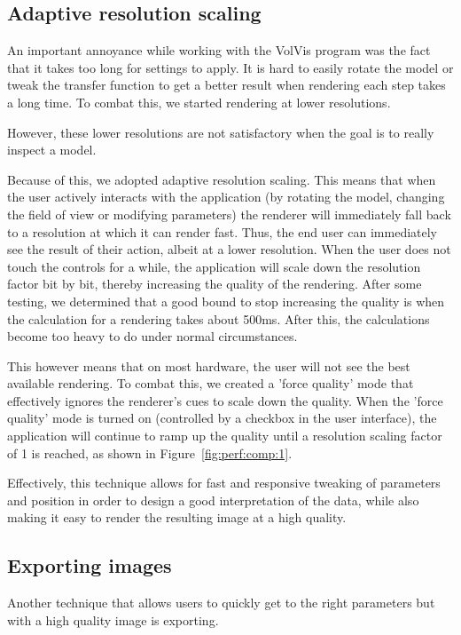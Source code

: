 \subsection{Adaptive resolution scaling}
An important annoyance while working with the VolVis program was the fact that it takes too long for settings to apply.
It is hard to easily rotate the model or tweak the transfer function to get a better result when rendering each step takes a long time.
To combat this, we started rendering at lower resolutions.

However, these lower resolutions are not satisfactory when the goal is to really inspect a model.

Because of this, we adopted adaptive resolution scaling.
This means that when the user actively interacts with the application (by rotating the model, changing the field of view or modifying parameters) the renderer will immediately fall back to a resolution at which it can render fast.
Thus, the end user can immediately see the result of their action, albeit at a lower resolution.
When the user does not touch the controls for a while, the application will scale down the resolution factor bit by bit, thereby increasing the quality of the rendering.
After some testing, we determined that a good bound to stop increasing the quality is when the calculation for a rendering takes about 500ms.
After this, the calculations become too heavy to do under normal circumstances.

This however means that on most hardware, the user will not see the best available rendering.
To combat this, we created a 'force quality' mode that effectively ignores the renderer's cues to scale down the quality.
When the 'force quality' mode is turned on (controlled by a checkbox in the user interface), the application will continue to ramp up the quality until a resolution scaling factor of 1 is reached, as shown in Figure~\ref{fig:perf:comp:1}.

Effectively, this technique allows for fast and responsive tweaking of parameters and position in order to design a good interpretation of the data, while also making it easy to render the resulting image at a high quality.

\subsection{Exporting images}
Another technique that allows users to quickly get to the right parameters but with a high quality image is exporting.

